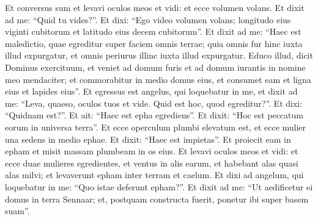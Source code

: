 \begin{biblechapter}  
\verse Et conversus sum et levavi oculos meos et vidi: et ecce volumen volans. 
\verse Et dixit ad me: “Quid tu vides?”. Et dixi: “Ego video volumen volans; longitudo eius viginti cubitorum et latitudo eius decem cubitorum”. 
\verse Et dixit ad me: “Haec est maledictio, quae egreditur super faciem omnis terrae; quia omnis fur hinc iuxta illud expurgatur, et omnis periurus illinc iuxta illud expurgatur. 
\verse Educo illud, dicit Dominus exercituum, et veniet ad domum furis et ad domum iurantis in nomine meo mendaciter; et commorabitur in medio domus eius, et consumet eam et ligna eius et lapides eius”. 
\verse Et egressus est angelus, qui loquebatur in me, et dixit ad me: “Leva, quaeso, oculos tuos et vide. Quid est hoc, quod egreditur?”. 
\verse Et dixi: “Quidnam est?”. Et ait: “Haec est epha egrediens”. Et dixit: “Hoc est peccatum eorum in universa terra”. 
\verse Et ecce operculum plumbi elevatum est, et ecce mulier una sedens in medio ephae. 
\verse Et dixit: “Haec est impietas”. Et proiecit eam in epham et misit massam plumbeam in os eius. 
\verse Et levavi oculos meos et vidi: et ecce duae mulieres egredientes, et ventus in alis earum, et habebant alas quasi alas milvi; et levaverunt epham inter terram et caelum. 
\verse Et dixi ad angelum, qui loquebatur in me: “Quo istae deferunt epham?”. 
\verse Et dixit ad me: “Ut aedificetur ei domus in terra Sennaar; et, postquam constructa fuerit, ponetur ibi super basem suam”. 
\end{biblechapter}

